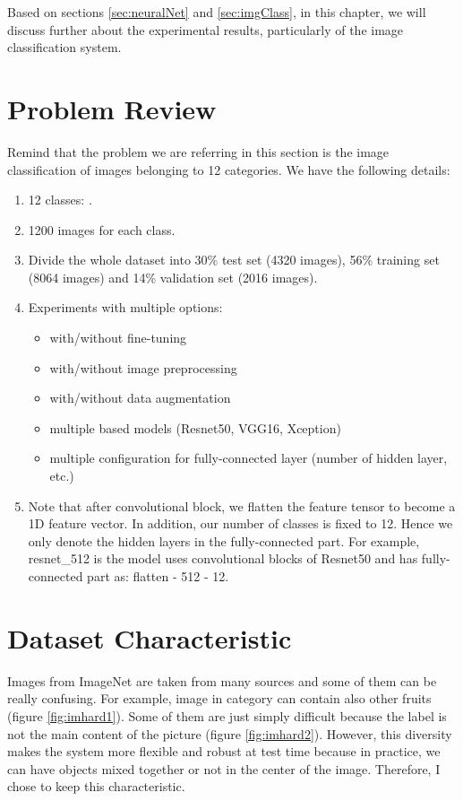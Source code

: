 \label{chap:ExpRes}
Based on sections \ref{sec:neuralNet} and \ref{sec:imgClass}, in this chapter, we will discuss further about the experimental results, particularly of the image classification system.

\section{Problem Review}
Remind that the problem we are referring in this section is the image classification of images belonging to 12 categories. We have the following details:
\begin{enumerate}
	\item 12 classes: .
	\item 1200 images for each class.
	\item Divide the whole dataset into 30\% test set (4320 images), 56\% training set (8064 images) and 14\% validation set (2016 images).
	\item Experiments with multiple options: 
	\begin{itemize}
		\item with/without fine-tuning
		\item with/without image preprocessing
		\item with/without data augmentation
		\item multiple based models (Resnet50, VGG16, Xception)
		\item multiple configuration for fully-connected layer (number of hidden layer, etc.)
	\end{itemize} 
	\item Note that after convolutional block, we flatten the feature tensor to become a 1D feature vector. In addition, our number of classes is fixed to 12. Hence we only denote the hidden layers in the fully-connected part. For example, resnet\_512 is the model uses convolutional blocks of Resnet50 and has fully-connected part as: flatten - 512 - 12. 
\end{enumerate}

\section{Dataset Characteristic}
Images from ImageNet are taken from many sources and some of them can be really confusing. For example, image in category  can contain also other fruits (figure \ref{fig:imhard1}). Some of them are just simply difficult because the label is not the main content of the picture (figure \ref{fig:imhard2}). However, this diversity makes the system more flexible and robust at test time because in practice, we can have objects mixed together or not in the center of the image. Therefore, I chose to keep this characteristic.

